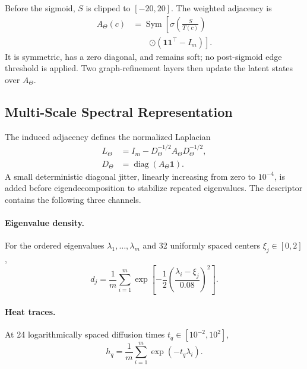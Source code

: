 \documentclass[authoryear,final,5p,times,twocolumn]{elsarticle}
\newcommand{\added}[1]{{\color{green!50!black}#1}}
\theoremstyle{plain}
\begin{document}
\added{Before the sigmoid, $S$ is clipped to $[-20,20]$.} The weighted adjacency is
\begin{equation}
\begin{aligned}
A_{\Theta}(c)
&=\operatorname{Sym}\!\left[
\sigma\!\left(\frac{S}{T(c)}\right)\right.\\
&\qquad\left.\odot
(\mathbf{1}\mathbf{1}^{\top}-I_m)
\right].
\end{aligned}
\label{eq:latent_adjacency}
\end{equation}
It is symmetric, has a zero diagonal, and remains soft; no post-sigmoid edge
threshold is applied. Two graph-refinement layers then update the latent states
over $A_{\Theta}$.

\subsection{Multi-Scale Spectral Representation}
\label{sec:multiscale_spectrum}

The induced adjacency defines the normalized Laplacian
\begin{equation}
\begin{aligned}
L_{\Theta}
&=I_m-D_{\Theta}^{-1/2}A_{\Theta}D_{\Theta}^{-1/2},\\
D_{\Theta}
&=\operatorname{diag}(A_{\Theta}\mathbf{1}).
\end{aligned}
\label{eq:normalized_laplacian}
\end{equation}
\added{A small deterministic diagonal jitter, linearly increasing from zero to
$10^{-4}$, is added before eigendecomposition to stabilize repeated eigenvalues.}
The descriptor contains the following three channels.

\paragraph{Eigenvalue density.}
For the ordered eigenvalues $\lambda_1,\ldots,\lambda_m$ and 32 uniformly
spaced centers $\xi_j\in[0,2]$,
\begin{equation}
d_j=\frac{1}{m}\sum_{i=1}^{m}
\exp\!\left[-\frac{1}{2}
\left(\frac{\lambda_i-\xi_j}{0.08}\right)^2\right].
\label{eq:eigenvalue_density}
\end{equation}

\paragraph{Heat traces.}
At 24 logarithmically spaced diffusion times $t_q\in[10^{-2},10^2]$,
\begin{equation}
h_q=\frac{1}{m}\sum_{i=1}^{m}\exp(-t_q\lambda_i).
\label{eq:heat_trace}
\end{equation}
\end{document}
